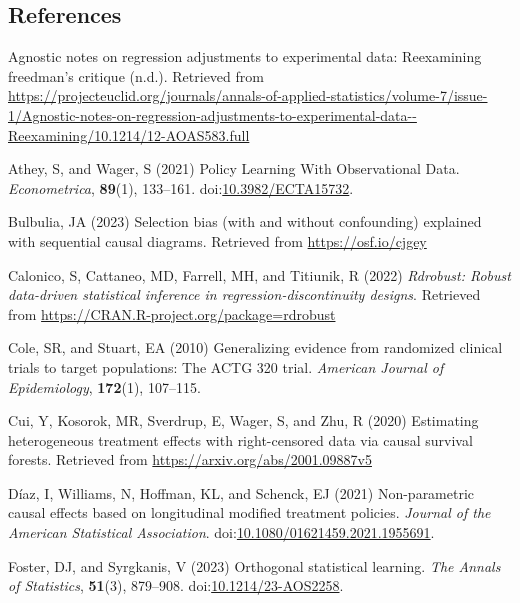 \documentclass[
  singlecolumn]{article}
\newlength{\cslhangindent}
\newenvironment{CSLReferences}[2] %
 {\begin{list}{}{%
  \setlength{\itemindent}{0pt}
  \setlength{\leftmargin}{0pt}
  \setlength{\parsep}{0pt}
  \ifodd #1
   \setlength{\leftmargin}{\cslhangindent}
   \setlength{\itemindent}{-1\cslhangindent}
  \fi
  \setlength{\itemsep}{#2\baselineskip}}}
 {\end{list}}
\begin{document}
\newpage{}

\subsection*{References}\label{references}

\label{refs}
\begin{CSLReferences}{1}{0}
Agnostic notes on regression adjustments to experimental data:
Reexamining freedman{'}s critique (n.d.). Retrieved from
\url{https://projecteuclid.org/journals/annals-of-applied-statistics/volume-7/issue-1/Agnostic-notes-on-regression-adjustments-to-experimental-data--Reexamining/10.1214/12-AOAS583.full}

Athey, S, and Wager, S (2021) Policy Learning With Observational Data.
\emph{Econometrica}, \textbf{89}(1), 133--161.
doi:\href{https://doi.org/10.3982/ECTA15732}{10.3982/ECTA15732}.

Bulbulia, JA (2023) Selection bias (with and without confounding)
explained with sequential causal diagrams. Retrieved from
\url{https://osf.io/cjgey}

Calonico, S, Cattaneo, MD, Farrell, MH, and Titiunik, R (2022)
\emph{Rdrobust: Robust data-driven statistical inference in
regression-discontinuity designs}. Retrieved from
\url{https://CRAN.R-project.org/package=rdrobust}

Cole, SR, and Stuart, EA (2010) Generalizing evidence from randomized
clinical trials to target populations: The ACTG 320 trial.
\emph{American Journal of Epidemiology}, \textbf{172}(1), 107--115.

Cui, Y, Kosorok, MR, Sverdrup, E, Wager, S, and Zhu, R (2020) Estimating
heterogeneous treatment effects with right-censored data via causal
survival forests. Retrieved from
\url{https://arxiv.org/abs/2001.09887v5}

Díaz, I, Williams, N, Hoffman, KL, and Schenck, EJ (2021) Non-parametric
causal effects based on longitudinal modified treatment policies.
\emph{Journal of the American Statistical Association}.
doi:\href{https://doi.org/10.1080/01621459.2021.1955691}{10.1080/01621459.2021.1955691}.

Foster, DJ, and Syrgkanis, V (2023) Orthogonal statistical learning.
\emph{The Annals of Statistics}, \textbf{51}(3), 879--908.
doi:\href{https://doi.org/10.1214/23-AOS2258}{10.1214/23-AOS2258}.


\end{CSLReferences}
\end{document}
